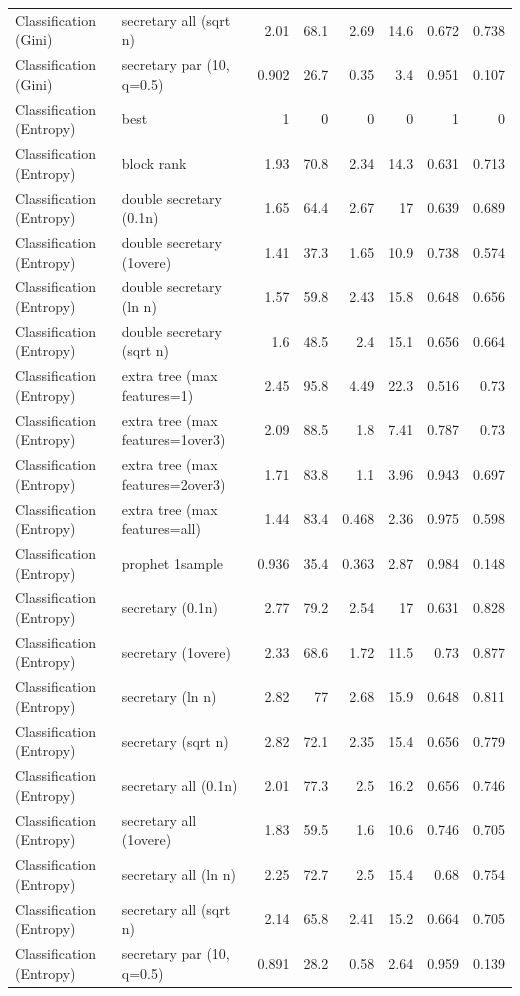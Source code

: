 \begin{table}[t]
\begin{tabular}{llrrrrrr}
Classification (Gini) & secretary all (sqrt n) & 2.01 & 68.1 & 2.69 & 14.6 & 0.672 & 0.738 \\
Classification (Gini) & secretary par (10, q=0.5) & 0.902 & 26.7 & 0.35 & 3.4 & 0.951 & 0.107 \\
Classification (Entropy) & best & 1 & 0 & 0 & 0 & 1 & 0 \\
Classification (Entropy) & block rank & 1.93 & 70.8 & 2.34 & 14.3 & 0.631 & 0.713 \\
Classification (Entropy) & double secretary (0.1n) & 1.65 & 64.4 & 2.67 & 17 & 0.639 & 0.689 \\
Classification (Entropy) & double secretary (1overe) & 1.41 & 37.3 & 1.65 & 10.9 & 0.738 & 0.574 \\
Classification (Entropy) & double secretary (ln n) & 1.57 & 59.8 & 2.43 & 15.8 & 0.648 & 0.656 \\
Classification (Entropy) & double secretary (sqrt n) & 1.6 & 48.5 & 2.4 & 15.1 & 0.656 & 0.664 \\
Classification (Entropy) & extra tree (max features=1) & 2.45 & 95.8 & 4.49 & 22.3 & 0.516 & 0.73 \\
Classification (Entropy) & extra tree (max features=1over3) & 2.09 & 88.5 & 1.8 & 7.41 & 0.787 & 0.73 \\
Classification (Entropy) & extra tree (max features=2over3) & 1.71 & 83.8 & 1.1 & 3.96 & 0.943 & 0.697 \\
Classification (Entropy) & extra tree (max features=all) & 1.44 & 83.4 & 0.468 & 2.36 & 0.975 & 0.598 \\
Classification (Entropy) & prophet 1sample & 0.936 & 35.4 & 0.363 & 2.87 & 0.984 & 0.148 \\
Classification (Entropy) & secretary (0.1n) & 2.77 & 79.2 & 2.54 & 17 & 0.631 & 0.828 \\
Classification (Entropy) & secretary (1overe) & 2.33 & 68.6 & 1.72 & 11.5 & 0.73 & 0.877 \\
Classification (Entropy) & secretary (ln n) & 2.82 & 77 & 2.68 & 15.9 & 0.648 & 0.811 \\
Classification (Entropy) & secretary (sqrt n) & 2.82 & 72.1 & 2.35 & 15.4 & 0.656 & 0.779 \\
Classification (Entropy) & secretary all (0.1n) & 2.01 & 77.3 & 2.5 & 16.2 & 0.656 & 0.746 \\
Classification (Entropy) & secretary all (1overe) & 1.83 & 59.5 & 1.6 & 10.6 & 0.746 & 0.705 \\
Classification (Entropy) & secretary all (ln n) & 2.25 & 72.7 & 2.5 & 15.4 & 0.68 & 0.754 \\
Classification (Entropy) & secretary all (sqrt n) & 2.14 & 65.8 & 2.41 & 15.2 & 0.664 & 0.705 \\
Classification (Entropy) & secretary par (10, q=0.5) & 0.891 & 28.2 & 0.58 & 2.64 & 0.959 & 0.139 \\
\bottomrule
\end{tabular}
\end{table}
